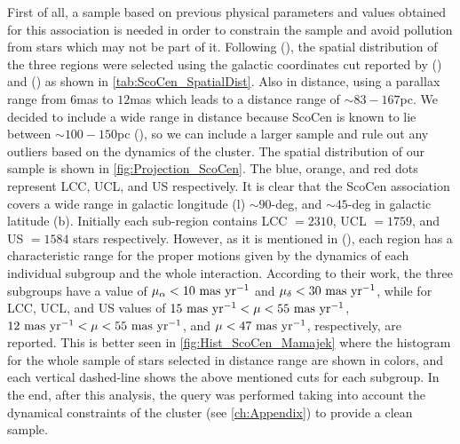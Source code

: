 First of all, a sample based on previous physical parameters and values obtained for this association is needed in order to constrain the sample and avoid pollution from stars which may not be part of it. Following  (\citeyear{2018MNRAS.tmp..210W}), the spatial distribution of the three regions were selected using the galactic coordinates cut reported by  (\citeyear{2012yCat..74163108R}) and  (\citeyear{1999AJ....117..354D}) as shown in \autoref{tab:ScoCen_SpatialDist}. Also in distance, using a parallax range from $6$mas to $12$mas which leads to a distance range of $\sim 83-167$pc. We decided to include a wide range in distance because ScoCen is known to lie between $\sim 100-150$pc  (\citeyear{2018MNRAS.tmp..210W}), so we can include a larger sample and rule out any outliers based on the dynamics of the cluster. The spatial distribution of our sample is shown in \autoref{fig:Projection_ScoCen}. The blue, orange, and red dots represent LCC, UCL, and US respectively. It is clear that the ScoCen association covers a wide range in galactic longitude (l) $\sim 90$-deg, and $\sim 45$-deg in galactic latitude (b). Initially each sub-region contains LCC $= 2310$, UCL $= 1759$, and US $= 1584$ stars respectively. However, as it is mentioned in  (\citeyear{2016MNRAS.461..794P}), each region has a characteristic range for the proper motions given by the dynamics of each individual subgroup and the whole interaction. According to their work, the three subgroups have a value of $\mu_\alpha < 10~\textnormal{mas}~\textnormal{yr}^{-1}$ and $\mu_\delta < 30~\textnormal{mas}~\textnormal{yr}^{-1}$, while for LCC, UCL, and US values of $15~\textnormal{mas}~\textnormal{yr}^{-1} < \mu < 55~\textnormal{mas}~\textnormal{yr}^{-1}$, $12~\textnormal{mas}~\textnormal{yr}^{-1} < \mu < 55~\textnormal{mas}~\textnormal{yr}^{-1}$, and $\mu < 47~\textnormal{mas}~\textnormal{yr}^{-1}$, respectively, are reported. This is better seen in \autoref{fig:Hist_ScoCen_Mamajek} where the histogram for the whole sample of stars selected in distance range are shown in colors, and each vertical dashed-line shows the above mentioned cuts for each subgroup. In the end, after this analysis, the query was performed taking into account the dynamical constraints of the cluster (see \autoref{ch:Appendix}) to provide a clean sample.\\  

